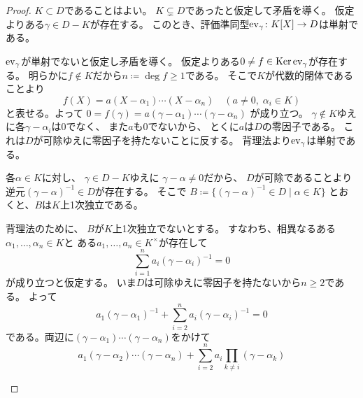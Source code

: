 \documentclass[report]{jlreq}
\begin{document}
\begin{proof}
    $K \subset D$であることはよい。
    $K \subsetneq D$であったと仮定して矛盾を導く。
    仮定よりある$\gamma \in D - K$が存在する。
    このとき、評価準同型$\mathrm{ev}_\gamma \colon K[X] \to D$は単射である。
    \begin{innerproof}
        $\mathrm{ev}_\gamma$が単射でないと仮定し矛盾を導く。
        仮定よりある$0 \neq f \in \operatorname{\mathrm{Ker}} \mathrm{ev}_\gamma$が存在する。
        明らかに$f \notin K$だから$n \coloneqq \deg f \ge 1$である。
        そこで$K$が代数的閉体であることより
        \begin{equation}
            f(X) = a(X - \alpha_1) \cdots (X - \alpha_n)
                \quad
                (a \neq 0, \; \alpha_i \in K)
        \end{equation}
        と表せる。よって
        $0 = f(\gamma) = a(\gamma - \alpha_1) \cdots (\gamma - \alpha_n)$
        が成り立つ。
        $\gamma \notin K$ゆえに各$\gamma - \alpha_i$は$0$でなく、
        また$a$も$0$でないから、
        とくに$a$は$D$の零因子である。
        これは$D$が可除ゆえに零因子を持たないことに反する。
        背理法より$\mathrm{ev}_\gamma$は単射である。
    \end{innerproof}
    各$\alpha \in K$に対し、
    $\gamma \in D - K$ゆえに
    $\gamma - \alpha \neq 0$だから、
    $D$が可除であることより
    逆元$(\gamma - \alpha)^{-1} \in D$が存在する。
    そこで
    $B \coloneqq
        \{
            (\gamma - \alpha)^{-1} \in D \mid \alpha \in K
        \}$
    とおくと、$B$は$K$上1次独立である。
    \begin{innerproof}
        背理法のために、
        $B$が$K$上1次独立でないとする。
        すなわち、相異なるある$\alpha_1, \dots, \alpha_n \in K$と
        ある$a_1, \dots, a_n \in K^\times$が存在して
        \begin{equation}
            \sum_{i = 1}^n a_i (\gamma - \alpha_i)^{-1} = 0
        \end{equation}
        が成り立つと仮定する。
        いま$D$は可除ゆえに零因子を持たないから$n \ge 2$である。
        よって
        \begin{equation}
            a_1 (\gamma - \alpha_1)^{-1}
                + \sum_{i = 2}^n a_i (\gamma - \alpha_i)^{-1}
                = 0
        \end{equation}
        である。両辺に$(\gamma - \alpha_1) \cdots (\gamma - \alpha_n)$をかけて
        \begin{equation}
            a_1 (\gamma - \alpha_2) \cdots (\gamma - \alpha_n)
                + \sum_{i = 2}^n a_i \prod_{k \neq i} (\gamma - \alpha_k)

\end{equation}
\end{innerproof}
\end{proof}
\end{document}
